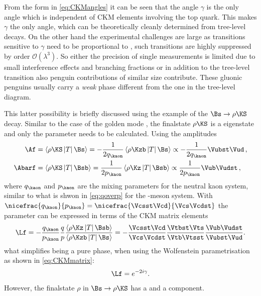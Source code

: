 From the form in \cref{eq:CKMangles} it can be seen that the angle $\gamma$ is the only angle which is independent of CKM elements involving the top quark.
This makes $\gamma$ the only angle, which can be theoretically cleanly determined from tree-level decays.
On the other hand the experimental challenges are large as transitions sensitive to $\gamma$ need to be proportional to \Vub, \ie such transitions are highly suppressed by order $\mathcal{O}\!\left(\lambda^3\right)$.
So either the precision of single measurements is limited due to small interference effects and branching fractions or in addition to the tree-level transition also penguin contributions of similar size contribute.
These gluonic penguins usually carry a \emph{weak} phase different from the one in the tree-level diagram.

This latter possibility is briefly discussed using the example of the $\Bs\to\rho\KS$ decay.
Similar to the case of the golden mode \BdToJPsiKS, the finalstate $\rho\KS$ is a \CP eigenstate and only the parameter \Lf needs to be calculated.
Using the amplitudes
\begin{equation}
\begin{aligned}
\Af&=\left<\rho\KS\left|T\right|\Bs\right>=-\frac{1}{2q_{\kaon}}\left<\rho\Kzb\left|T\right|\Bs\right>\propto-\frac{1}{2q_{\kaon}}\Vubst\Vud\,,\\
\Abarf&=\left<\rho\KS\left|T\right|\Bsb\right>=\frac{1}{2p_{\kaon}}\left<\rho\Kz\left|T\right|\Bsb\right>\propto\frac{1}{2p_{\kaon}}\Vub\Vudst\,,
\end{aligned}
\end{equation}
where $q_{\kaon}$ and $p_{\kaon}$ are the mixing parameters for the neutral kaon system, similar to what is shwon in \cref{eq:qoverp} for the \Bz-meson system.
With $\nicefrac{q_{\kaon}}{p_{\kaon}}=\nicefrac{\Vcsst\Vcd}{\Vcs\Vcdst}$ the parameter \Lf can be expressed in terms of the CKM matrix elements
\begin{equation}
\Lf=-\frac{q_{\kaon}}{p_{\kaon}}\frac{q}{p}\frac{\left<\rho\Kz\left|T\right|\Bsb\right>}{\left<\rho\Kzb\left|T\right|\Bs\right>}
=-\frac{\Vcsst\Vcd}{\Vcs\Vcdst}\frac{\Vtbst\Vts}{\Vtb\Vtsst}\frac{\Vub\Vudst}{\Vubst\Vud}.
\end{equation}
what simplifies \Lf being a pure phase, when using the Wolfenstein parametrisation as shown in \cref{eq:CKMmatrix}:
\begin{equation}
\Lf=e^{-2i\gamma}.
\end{equation}
However, the finalstate $\rho$ in $\Bs\to\rho\KS$ has a \uquark\uquarkbar and a \dquark\dquarkbar component.
